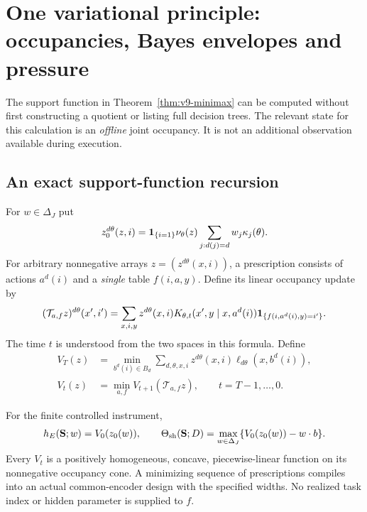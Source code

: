 \section{One variational principle: occupancies, Bayes envelopes and pressure}
\label{sec:v9-variational}
The support function in Theorem~\ref{thm:v9-minimax} can be computed
without first constructing a quotient or listing full decision trees.
The relevant state for this calculation is an \emph{offline} joint
occupancy. It is not an additional observation available during execution.

\subsection{An exact support-function recursion}
For $w\in\Delta_J$ put
\[
 z_0^{d\theta}(z,i)=\mathbf 1_{\{i=1\}}\nu_\theta(z)
              \sum_{j:d(j)=d}w_j\kappa_j(\theta).
\]
For arbitrary nonnegative arrays $z=(z^{d\theta}(x,i))$, a prescription
consists of actions $a^d(i)$ and a \emph{single} table $f(i,a,y)$.
Define its linear occupancy update by
\begin{equation}
 (\mathcal T_{a,f}z)^{d\theta}(x',i')
  =\sum_{x,i,y}z^{d\theta}(x,i)
       K_{\theta,t}(x',y\mid x,a^d(i))
       \mathbf 1_{\{f(i,a^d(i),y)=i'\}}.
 \label{eq:v9-occupancy}
\end{equation}
The time $t$ is understood from the two spaces in this formula. Define
\begin{align}
 V_T(z)&=\min_{b^d(i)\in B_d}
                \sum_{d,\theta,x,i}z^{d\theta}(x,i)
                          \ell_{d\theta}(x,b^d(i)),\label{eq:v9-terminalbellman}\\
 V_t(z)&=\min_{a,f}V_{t+1}(\mathcal T_{a,f}z),
                                     \qquad t=T-1,\ldots,0.
 \label{eq:v9-bellman}
\end{align}
\begin{theorem}
\label{thm:v9-occupancy}
For the finite controlled instrument,
\begin{equation}
 h_E({\bf S};w)=V_0(z_0(w)),\qquad
 \Theta_{\rm sh}({\bf S};D)
       =\max_{w\in\Delta_J}\{V_0(z_0(w))-w\cdot b\}.
 \label{eq:v9-occupancyspectrum}
\end{equation}
Every $V_t$ is a positively homogeneous, concave, piecewise-linear
function on its nonnegative occupancy cone. A minimizing sequence of
prescriptions compiles into an actual common-encoder design with the
specified widths. No realized task index or hidden parameter is
supplied to $f$.
\end{theorem}
